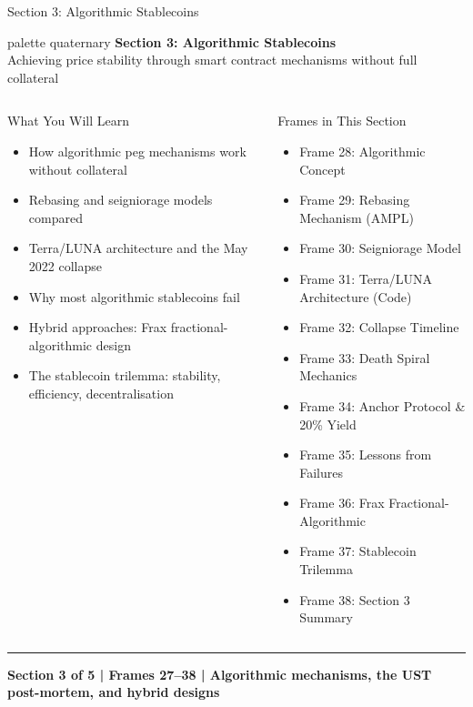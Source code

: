 \documentclass[8pt,aspectratio=169]{beamer}
\newcommand{\bottomnote}[1]{\vfill\vspace{-2mm}\textcolor{mllavender2}{\rule{\textwidth}{0.4pt}}\vspace{1mm}\footnotesize\textbf{#1}}
\begin{document}
\begin{frame}{Section 3: Algorithmic Stablecoins}
\begin{beamercolorbox}[sep=12pt,center,rounded=true,shadow=true]{palette quaternary}
  {\Large\bfseries Section 3: Algorithmic Stablecoins}\\[4pt]
  {\normalsize Achieving price stability through smart contract mechanisms without full collateral}
\end{beamercolorbox}

\vspace{4mm}
\begin{columns}[T]
\begin{block}{What You Will Learn}
\begin{itemize}\setlength{\itemsep}{2pt}
  \item How algorithmic peg mechanisms work without collateral
  \item Rebasing and seigniorage models compared
  \item Terra/LUNA architecture and the May 2022 collapse
  \item Why most algorithmic stablecoins fail
  \item Hybrid approaches: Frax fractional-algorithmic design
  \item The stablecoin trilemma: stability, efficiency, decentralisation
\end{itemize}
\end{block}
\begin{block}{Frames in This Section}
\begin{itemize}\setlength{\itemsep}{2pt}
  \item Frame 28: Algorithmic Concept
  \item Frame 29: Rebasing Mechanism (AMPL)
  \item Frame 30: Seigniorage Model
  \item Frame 31: Terra/LUNA Architecture (Code)
  \item Frame 32: Collapse Timeline
  \item Frame 33: Death Spiral Mechanics
  \item Frame 34: Anchor Protocol \& 20\% Yield
  \item Frame 35: Lessons from Failures
  \item Frame 36: Frax Fractional-Algorithmic
  \item Frame 37: Stablecoin Trilemma
  \item Frame 38: Section 3 Summary
\end{itemize}
\end{block}
\end{columns}
\bottomnote{Section 3 of 5 | Frames 27--38 | Algorithmic mechanisms, the UST post-mortem, and hybrid designs}
\end{frame}
\end{document}

